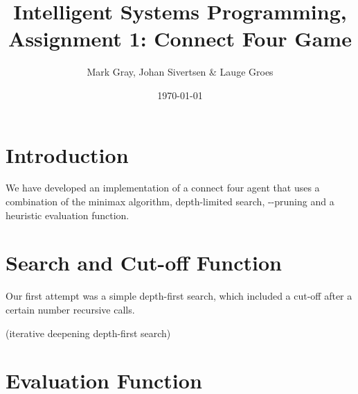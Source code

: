\documentclass[11pt, a4paper]{article}
\author{Mark Gray, Johan Sivertsen \& Lauge Groes}
\title{Intelligent Systems Programming, Assignment 1: Connect Four Game}
\date{\today}
\begin{document}
\maketitle
\newpage
\section*{Introduction}


We have developed an implementation of a connect four agent that uses a
combination of the minimax algorithm, depth-limited search,
\alpha-\beta-pruning and a heuristic evaluation function.

\section*{Search and Cut-off Function}
Our first attempt was a simple depth-first search, which included a cut-off
after a certain number recursive calls. 

(iterative deepening depth-first search)

\section*{Evaluation Function}
\end{document}
